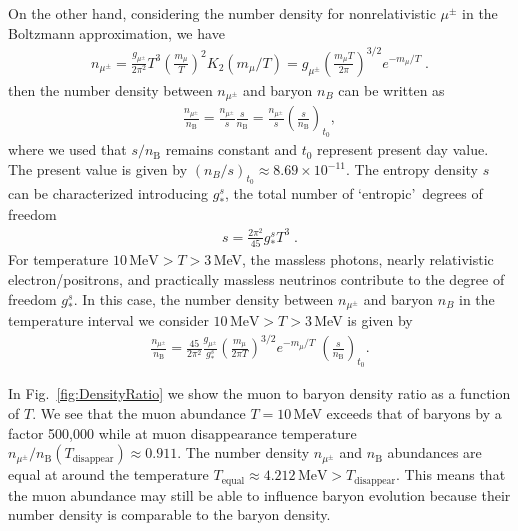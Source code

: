 On the other hand, considering the number density for nonrelativistic $\mu^\pm$ in the Boltzmann approximation, we have
\begin{align}\label{nmupm}
n_{\mu^\pm}=\frac{g_{\mu^\pm}}{2\pi^2}T^3\left(\frac{m_\mu}{T}\right)^2 K_2(m_\mu/T)=g_{\mu^\pm}\left(\frac{m_\mu T}{2\pi}\right)^{3/2}e^{-{m_\mu}/{T}}\;. 
\end{align}
then the number density between $n_{\mu^\pm}$ and baryon $n_B$ can be written as
\begin{align}
\frac{n_{\mu^\pm}}{n_\mathrm{B}}=\frac{n_{\mu^\pm}}{s}\frac{s}{n_\mathrm{B}}=
\frac{n_{\mu^\pm}}{s}\left(\frac{s}{n_\mathrm{B}}\right)_{\!t_0},
\end{align}
where we used that $s/n_\mathrm{B}$ remains constant and $t_0$ represent present day value. The present value is given by $(n_B/s)_{t_0}\approx8.69\times10^{-11}$. The entropy density $s$ can be characterized introducing $g^s_\ast$, the total number of \lq entropic\rq\ degrees of freedom
\begin{align}%
s=\frac{2\pi^2}{45}g^s_\ast T^3\;.
\end{align}
For temperature $10\,\mathrm{MeV} >T>3 $\,MeV, the massless photons, nearly relativistic electron/positrons, and practically massless neutrinos contribute to the degree of freedom $g^s_\ast$.  In this case, the number density between $n_{\mu^\pm}$ and baryon $n_B$ in the temperature interval we consider $10\,\mathrm{MeV} >T>3 $\,MeV is given by
\begin{align}\label{nmuperbF} 
\frac{n_{\mu^\pm}}{n_\mathrm{B}}=\frac{45}{2\pi^2}\frac{g_{\mu^\pm}}{g^s_\ast}\left(\frac{m_\mu}{2\pi T}\right)^{3/2}e^{-{m_\mu}/{T}}\;\left(\frac{s}{n_\mathrm{B}}\right)_{\!t_0}.
\end{align}
 
In Fig.~\ref{fig:DensityRatio} we show the muon to baryon density ratio  as a function of $T$. We see that the muon abundance $T=10$\,MeV exceeds that of baryons by a factor 500,000 while at muon disappearance temperature $n_{\mu^\pm}/n_\mathrm{B}(T_\mathrm{disappear})\approx0.911$. The number density $n_{\mu^\pm}$ and $n_\mathrm{B}$  abundances are equal at around the temperature $T_\mathrm{equal}\approx4.212\,\mathrm{MeV} >  T_\mathrm{disappear}$.  This means that the muon abundance may still be able to influence baryon evolution because their number density is comparable to the baryon density.%

